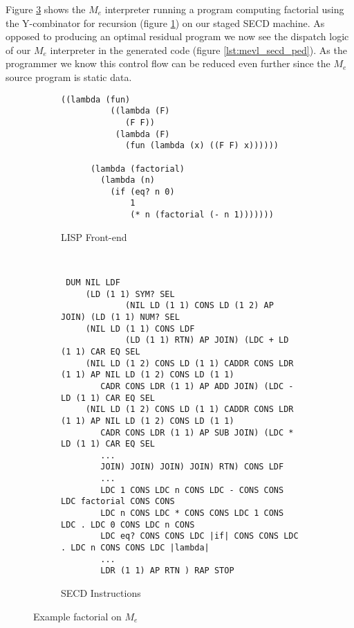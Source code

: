 \documentclass[a4paper,12pt,twoside,openright]{report}
\theoremstyle{definition}
\newcommand{\mevl}{$M_{e}$}
\begin{document}
Figure \ref{lst:mevl_secd_all} shows the \mevl{} interpreter running a program computing factorial using the Y-combinator for recursion (figure \ref{lst:mevl_secd_lisp}) on our staged SECD machine. As opposed to producing an optimal residual program we now see the dispatch logic of our \mevl{} interpreter in the generated code (figure \ref{lst:mevl_secd_ped}). As the programmer we know this control flow can be reduced even further since the \mevl{} source program is static data.


\begin{figure}[htp!]
\centering
    \begin{subfigure}{.5\linewidth}
         \centering
         \begin{verbatim}
((lambda (fun)
          ((lambda (F)
             (F F))
           (lambda (F)
             (fun (lambda (x) ((F F) x))))))

      (lambda (factorial)
        (lambda (n)
          (if (eq? n 0)
              1
              (* n (factorial (- n 1)))))))
         \end{verbatim}
         \caption{LISP Front-end}
         \label{lst:mevl_secd_lisp}
    \end{subfigure}\\[1ex]
    \par\bigskip
    \begin{subfigure}{\linewidth}
         \centering
         \begin{verbatim}
 DUM NIL LDF
     (LD (1 1) SYM? SEL
             (NIL LD (1 1) CONS LD (1 2) AP JOIN) (LD (1 1) NUM? SEL
     (NIL LD (1 1) CONS LDF
             (LD (1 1) RTN) AP JOIN) (LDC + LD (1 1) CAR EQ SEL
     (NIL LD (1 2) CONS LD (1 1) CADDR CONS LDR (1 1) AP NIL LD (1 2) CONS LD (1 1)
        CADR CONS LDR (1 1) AP ADD JOIN) (LDC - LD (1 1) CAR EQ SEL
     (NIL LD (1 2) CONS LD (1 1) CADDR CONS LDR (1 1) AP NIL LD (1 2) CONS LD (1 1)
        CADR CONS LDR (1 1) AP SUB JOIN) (LDC * LD (1 1) CAR EQ SEL
        ...
        JOIN) JOIN) JOIN) JOIN) RTN) CONS LDF
        ...
        LDC 1 CONS LDC n CONS LDC - CONS CONS LDC factorial CONS CONS
        LDC n CONS LDC * CONS CONS LDC 1 CONS LDC . LDC 0 CONS LDC n CONS
        LDC eq? CONS CONS LDC |if| CONS CONS LDC . LDC n CONS CONS LDC |lambda|
        ...
        LDR (1 1) AP RTN ) RAP STOP
         \end{verbatim}
    \caption{SECD Instructions}
    \label{lst:mevl_secd_ops}
    \end{subfigure}
\caption{Example factorial on \mevl}
\label{lst:mevl_secd_all}
\end{figure}
\end{document}
